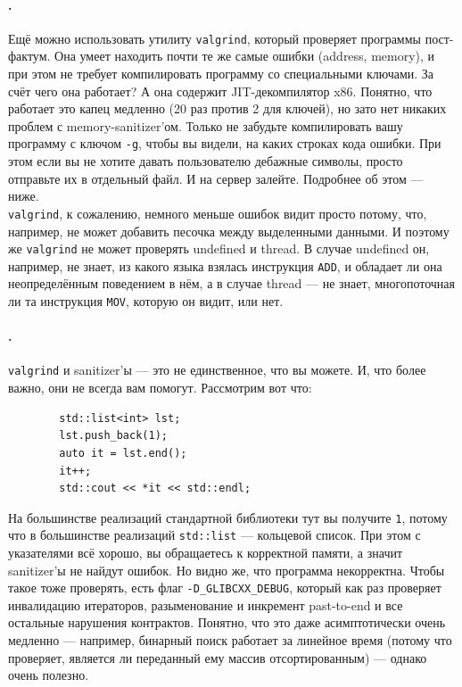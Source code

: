 \documentclass{article}
\newcommand{\asm}[1]{\texttt{#1}}
\begin{document}
    \paragraph{.}
    Ещё можно использовать утилиту \texttt{valgrind}, который проверяет программы пост-фактум. Она умеет находить почти те же самые ошибки (address, memory), и при этом не требует компилировать программу со специальными ключами. За счёт чего она работает? А она содержит JIT-декомпилятор x86. Понятно, что работает это капец медленно (20 раз против 2 для ключей), но зато нет никаких проблем с memory-sanitizer'ом. Только не забудьте компилировать вашу программу с ключом \texttt{-g}, чтобы вы видели, на каких строках кода ошибки. При этом если вы не хотите давать пользователю дебажные символы, просто отправьте их в отдельный файл. И на сервер залейте. Подробнее об этом --- ниже.\\
    \texttt{valgrind}, к сожалению, немного меньше ошибок видит просто потому, что, например, не может добавить песочка между выделенными данными. И поэтому же \texttt{valgrind} не может проверять undefined и thread. В случае undefined он, например, не знает, из какого языка взялась инструкция \asm{ADD}, и обладает ли она неопределённым поведением в нём, а в случае thread --- не знает, многопоточная ли та инструкция \asm{MOV}, которую он видит, или нет.
    \paragraph{.}
    \texttt{valgrind} и sanitizer'ы --- это не единственное, что вы можете. И, что более важно, они не всегда вам помогут. Рассмотрим вот что:
    \begin{verbatim}
        std::list<int> lst;
        lst.push_back(1);
        auto it = lst.end();
        it++;
        std::cout << *it << std::endl;
    \end{verbatim}
    На большинстве реализаций стандартной библиотеки тут вы получите \texttt{1}, потому что в большинстве реализаций \texttt{std::list} --- кольцевой список. При этом с указателями всё хорошо, вы обращаетесь к корректной памяти, а значит sanitizer'ы не найдут ошибок. Но видно же, что программа некорректна. Чтобы такое тоже проверять, есть флаг \texttt{-D_GLIBCXX_DEBUG}, который как раз проверяет инвалидацию итераторов, разыменование и инкремент past-to-end и все остальные нарушения контрактов. Понятно, что это даже асимптотически очень медленно --- например, бинарный поиск работает за линейное время (потому что проверяет, является ли переданный ему массив отсортированным) --- однако очень полезно.
\end{document}
